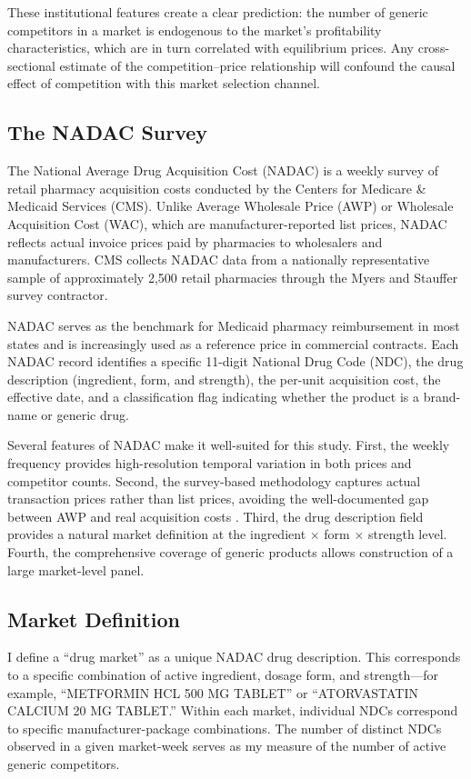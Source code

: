 \documentclass[12pt]{article}
\begin{document}
These institutional features create a clear prediction: the number of generic competitors in a market is endogenous to the market's profitability characteristics, which are in turn correlated with equilibrium prices. Any cross-sectional estimate of the competition--price relationship will confound the causal effect of competition with this market selection channel.

\subsection{The NADAC Survey}

The National Average Drug Acquisition Cost (NADAC) is a weekly survey of retail pharmacy acquisition costs conducted by the Centers for Medicare \& Medicaid Services (CMS). Unlike Average Wholesale Price (AWP) or Wholesale Acquisition Cost (WAC), which are manufacturer-reported list prices, NADAC reflects actual invoice prices paid by pharmacies to wholesalers and manufacturers. CMS collects NADAC data from a nationally representative sample of approximately 2,500 retail pharmacies through the Myers and Stauffer survey contractor.

NADAC serves as the benchmark for Medicaid pharmacy reimbursement in most states and is increasingly used as a reference price in commercial contracts. Each NADAC record identifies a specific 11-digit National Drug Code (NDC), the drug description (ingredient, form, and strength), the per-unit acquisition cost, the effective date, and a classification flag indicating whether the product is a brand-name or generic drug.

Several features of NADAC make it well-suited for this study. First, the weekly frequency provides high-resolution temporal variation in both prices and competitor counts. Second, the survey-based methodology captures actual transaction prices rather than list prices, avoiding the well-documented gap between AWP and real acquisition costs \citep{Berndt2007}. Third, the drug description field provides a natural market definition at the ingredient $\times$ form $\times$ strength level. Fourth, the comprehensive coverage of generic products allows construction of a large market-level panel.

\subsection{Market Definition}

I define a ``drug market'' as a unique NADAC drug description. This corresponds to a specific combination of active ingredient, dosage form, and strength---for example, ``METFORMIN HCL 500 MG TABLET'' or ``ATORVASTATIN CALCIUM 20 MG TABLET.'' Within each market, individual NDCs correspond to specific manufacturer-package combinations. The number of distinct NDCs observed in a given market-week serves as my measure of the number of active generic competitors.
\end{document}
